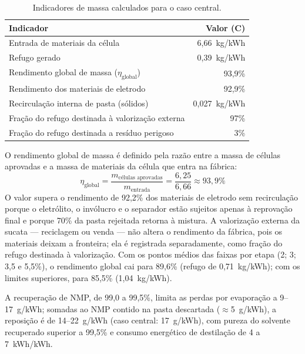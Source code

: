 \begin{table}[H]
\centering
\caption{Indicadores de massa calculados para o caso central.}
\label{tab:giga-indicadores-calc}
\small
\renewcommand{\arraystretch}{1.15}
\begin{tabular}{@{} l r @{}}
\toprule
\textbf{Indicador} & \textbf{Valor (C)} \\
\midrule
Entrada de materiais da célula & 6,66~kg/kWh \\
Refugo gerado & 0,39~kg/kWh \\
Rendimento global de massa ($\eta_{\text{global}}$) & 93,9\% \\
Rendimento dos materiais de eletrodo & 92,9\% \\
Recirculação interna de pasta (sólidos) & 0,027~kg/kWh \\
Fração do refugo destinada à valorização externa & 97\% \\
Fração do refugo destinada a resíduo perigoso & 3\% \\
\bottomrule
\end{tabular}
\end{table}

O rendimento global de massa é definido pela razão entre a massa de células
aprovadas e a massa de materiais da célula que entra na fábrica:
\begin{equation}
\eta_{\text{global}} = \frac{m_{\text{células aprovadas}}}{m_{\text{entrada}}}
= \frac{6{,}25}{6{,}66} \approx 93{,}9\%
\label{eq:giga-rendimento}
\end{equation}
O valor supera o rendimento de 92,2\% dos materiais de eletrodo sem recirculação
porque o eletrólito, o invólucro e o separador estão sujeitos apenas à reprovação
final e porque 70\% da pasta rejeitada retorna à mistura. A valorização externa da
sucata — reciclagem ou venda — não altera o rendimento da fábrica, pois os
materiais deixam a fronteira; ela é registrada separadamente, como fração do
refugo destinada à valorização. Com os pontos médios das faixas por etapa (2; 3;
3,5 e 5,5\%), o rendimento global cai para 89,6\% (refugo de 0,71~kg/kWh); com os
limites superiores, para 85,5\% (1,04~kg/kWh).

A recuperação de NMP, de 99,0 a 99,5\%, limita as perdas por evaporação a
9--17~g/kWh; somadas ao NMP contido na pasta descartada ($\approx$5~g/kWh), a
reposição é de 14--22~g/kWh (caso central: 17~g/kWh), com pureza do solvente
recuperado superior a 99,5\% e consumo energético de destilação de 4 a
7~kWh/kWh.

